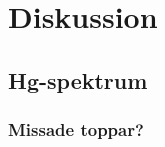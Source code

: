 \documentclass[11pt,a4paper]{article}
\begin{document}
 \section{Diskussion}





\subsection{Hg-spektrum}

\subsubsection{Missade toppar?}
\end{document}
